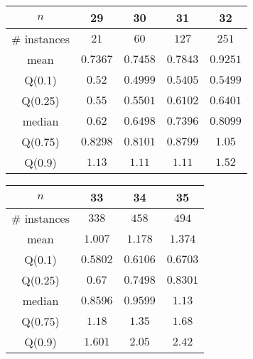 \begin{tabular}{c|cccc} 
\hline 
$n$ & 29 & 30 & 31 & 32 \tabularnewline 
\hline 
\hline 
\# instances & $21$ & $60$ & $127$ & $251$ \tabularnewline 
mean & $0.7367$ & $0.7458$ & $0.7843$ & $0.9251$ \tabularnewline 
Q(0.1) & $0.52$ & $0.4999$ & $0.5405$ & $0.5499$ \tabularnewline 
Q(0.25) & $0.55$ & $0.5501$ & $0.6102$ & $0.6401$ \tabularnewline 
median & $0.62$ & $0.6498$ & $0.7396$ & $0.8099$ \tabularnewline 
Q(0.75) & $0.8298$ & $0.8101$ & $0.8799$ & $1.05$ \tabularnewline 
Q(0.9) & $1.13$ & $1.11$ & $1.11$ & $1.52$ \tabularnewline 
\hline 
\end{tabular} 
\medskip{} 

\begin{tabular}{c|ccc} 
\hline 
$n$ & 33 & 34 & 35 \tabularnewline 
\hline 
\hline 
\# instances & $338$ & $458$ & $494$ \tabularnewline 
mean & $1.007$ & $1.178$ & $1.374$ \tabularnewline 
Q(0.1) & $0.5802$ & $0.6106$ & $0.6703$ \tabularnewline 
Q(0.25) & $0.67$ & $0.7498$ & $0.8301$ \tabularnewline 
median & $0.8596$ & $0.9599$ & $1.13$ \tabularnewline 
Q(0.75) & $1.18$ & $1.35$ & $1.68$ \tabularnewline 
Q(0.9) & $1.601$ & $2.05$ & $2.42$ \tabularnewline 
\hline 
\end{tabular} 
\medskip{} 

